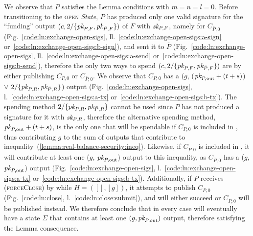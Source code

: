   We observe that $P$ satisfies the Lemma conditions with $m = n = l = 0$.
  Before transitioning to the \textsc{open} \textit{State}, $P$ has produced
  only one valid signature for the ``funding'' output $(c, 2/\{\textit{pk}_{P, F},
  \textit{pk}_{\bar{P}, F}\})$ of $F$ with $\textit{sk}_{P, F}$, namely for $C_{\bar{P}, 0}$
  (Fig.~\ref{code:ln:exchange-open-sigs},
  ll.~\ref{code:ln:exchange-open-sigs:a-sign}
  or~\ref{code:ln:exchange-open-sigs:b-sign}), and sent it to $\bar{P}$
  (Fig.~\ref{code:ln:exchange-open-sigs},
  ll.~\ref{code:ln:exchange-open-sigs:a-send}
  or~\ref{code:ln:exchange-open-sigs:b-send}), therefore the only two ways to
  spend $(c, 2/\{\textit{pk}_{P, F}, \textit{pk}_{\bar{P}, F}\})$ are by either publishing $C_{P,
  0}$ or $C_{\bar{P}, 0}$. We observe that $C_{P, 0}$ has a ($g$, ($\textit{pk}_{P,
  \mathrm{out}} + (t + s)$) $\vee$ $2/\{\textit{pk}_{P, R}, \textit{pk}_{\bar{P}, R}\}$) output
  (Fig.~\ref{code:ln:exchange-open-sigs},
  l.~\ref{code:ln:exchange-open-sigs:a-tx}
  or~\ref{code:ln:exchange-open-sigs:b-tx}). The spending method $2/\{\textit{pk}_{P, R},
  \textit{pk}_{\bar{P}, R}\}$ cannot be used since $P$ has not produced a signature for
  it with $\textit{sk}_{P, R}$, therefore the alternative spending method, $\textit{pk}_{P,
  \mathrm{out}} + (t + s)$, is the only one that will be spendable if $C_{P, 0}$
  is included in \ledger, thus contributing $g$ to the sum of outputs that
  contribute to inequality~(\ref{lemma:real-balance-security:ineq}). Likewise,
  if $C_{\bar{P}, 0}$ is included in \ledger, it will contribute at least one
  ($g$, $\textit{pk}_{P, \mathrm{out}}$) output to this inequality, as $C_{\bar{P}, 0}$
  has a ($g$, $\textit{pk}_{P, \mathrm{out}}$) output
  (Fig.~\ref{code:ln:exchange-open-sigs},
  l.~\ref{code:ln:exchange-open-sigs:a-tx}
  or~\ref{code:ln:exchange-open-sigs:b-tx}). Additionally, if $P$ receives
  (\textsc{forceClose}) by \environment while $H = ([], [g])$, it attempts to publish
  $C_{P, 0}$ (Fig.~\ref{code:ln:close}, l.~\ref{code:ln:close:submit}), and will
  either succeed or $C_{\bar{P}, 0}$ will be published instead. We therefore
  conclude that in every case \ledger will eventually have a state $\Sigma$ that
  contains at least one $(g, \textit{pk}_{P, \mathrm{out}})$ output, therefore satisfying
  the Lemma consequence.

